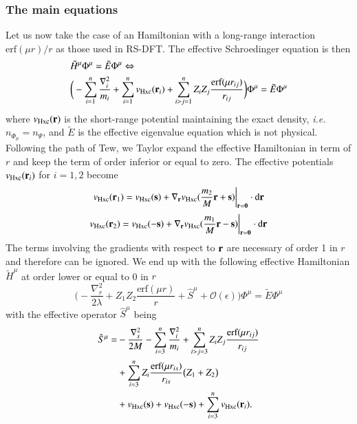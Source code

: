 \documentclass[aip,jcp,reprint,noshowkeys,superscriptaddress]{revtex4-1}
\newcommand{\bd}[1]{{\bf {#1}}}
\newcommand{\br}[0]{{\bf {r}}}
\newcommand{\bs}[0]{{\bf {s}}}
\begin{document}
\subsubsection{The main equations}
Let us now take the case of an Hamiltonian with a long-range interaction $\text{erf}(\mu r)/r$ as those used in RS-DFT. 
The effective Schroedinger equation is then 
\begin{equation}
 \begin{aligned}
& \tilde{H}^\mu \Phi^{\mu} = \tilde{E} \Phi^{\mu} \Leftrightarrow \\
& \bigg( -\sum_{i=1}^n \frac{\nabla_i^2}{m_i} + \sum_{i=1}^n v_{\text{Hxc}}(\bd{r}_i) + \sum_{i>j=1}^n Z_i Z_j \frac{\text{erf}(\mu r_{ij})}{r_{ij}}\bigg) \Phi^{\mu} = \tilde{E} \Phi^{\mu}
 \end{aligned}
\end{equation}
where $v_{\text{Hxc}}(\bd{r})$ is the short-range potential maintaining the exact density, \textit{i.e.} $n_{\Phi_{\mu}} = n_{\Psi}$, and $\tilde{E}$ is the effective eigenvalue equation which is not physical. 
Following the path of Tew, we Taylor expand the effective Hamiltonian in term of $r$ and keep the term of order inferior or equal to zero. 
The effective potentials $v_{\text{Hxc}}(\bd{r}_i)$ for $i=1,2$ become 
\begin{equation}
 v_{\text{Hxc}}(\bd{r}_1) = v_{\text{Hxc}}(\bs) + \nabla_{\bd{r}} v_{\text{Hxc}}(\frac{m_2}{M}\br + \bs) \bigg|_{\br = {\bd{0}}} \cdot \text{d}\br
\end{equation}
\begin{equation}
 v_{\text{Hxc}}(\bd{r}_2) = v_{\text{Hxc}}(-\bs) + \nabla_{\bd{r}} v_{\text{Hxc}}(\frac{m_1}{M}\br - \bs) \bigg|_{\br = {\bd{0}}}  \cdot \text{d}\br 
\end{equation}
The terms involving the gradients with respect to $\bd{r}$ are necessary of order 1 in $r$ and therefore can be ignored. 
We end up with the following effective Hamiltonian $\tilde{H}^\mu $ at order lower or equal to 0 in $r$ 
\begin{equation}
 \label{eq:hmu}
 \bigg( - \frac{\nabla_r^2}{2\lambda} + Z_1 Z_2\frac{\text{erf}(\mu r)}{r} + \hat{S}^\mu + \mathcal{O}(\epsilon) \bigg) \Phi^{\mu} = \tilde{E} \Phi^\mu
\end{equation}
with the effective operator $\hat{S}^\mu$ being
\begin{equation}
 \begin{aligned}
 \hat{S}^\mu = &-\frac{\nabla_{s}^2}{2 M}  - \sum_{i=3}^n \frac{\nabla_i^2}{m_i}  + \sum_{i>j=3}^n Z_i Z_j\frac{\text{erf}(\mu r_{ij})}{r_{ij}}  \\ 
& + \sum_{i=3}^n Z_i\frac{\text{erf}(\mu r_{is})}{r_{is}} \big( Z_1+Z_2 \big) \\ 
&+ v_{\text{Hxc}}(\bs) + v_{\text{Hxc}}(-\bs) + \sum_{i=3}^n v_{\text{Hxc}}(\bd{r}_i). 
 \end{aligned}
\end{equation}
\end{document}
